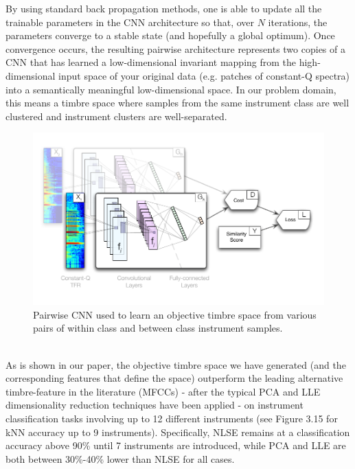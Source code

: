 \documentclass[a4paper,12pt]{report} 	%
\numberwithin{figure}{chapter}
\numberwithin{table}{chapter}
\numberwithin{equation}{chapter}
\begin{document}
\begin{flushleft}
By using standard back propagation methods, one is able to update all the trainable parameters in the CNN architecture so that, over $N$ iterations, the parameters converge to a stable state (and hopefully a global optimum). Once convergence occurs, the resulting pairwise architecture represents two copies of a CNN that has learned a low-dimensional invariant mapping from the high-dimensional input space of your original data (e.g. patches of constant-Q spectra) into a semantically meaningful low-dimensional space. In our problem domain, this means a timbre space where samples from the same instrument class are well clustered and instrument clusters are well-separated.
\begin{figure}[h!]
\begin{center}
\includegraphics[scale=0.95]{PairwiseCNN}
\caption[Pairwise CNN Architecture]{Pairwise CNN used to learn an objective timbre space from various pairs of within class and between class instrument samples.}
\end{center}
\end{figure}
\\
As is shown in our paper, the objective timbre space we have generated (and the corresponding features that define the space) outperform the leading alternative timbre-feature in the literature (MFCCs) - after the typical PCA and LLE dimensionality reduction techniques have been applied - on instrument classification tasks involving up to 12 different instruments (see Figure 3.15 for kNN accuracy up to 9 instruments). Specifically, NLSE remains at a classification accuracy above 90\% until 7 instruments are introduced, while PCA and LLE are both between 30\%-40\% lower than NLSE for all cases.
\begin{figure}[h!]
\begin{center}

\end{center}
\end{figure}
\end{flushleft}
\end{document}
